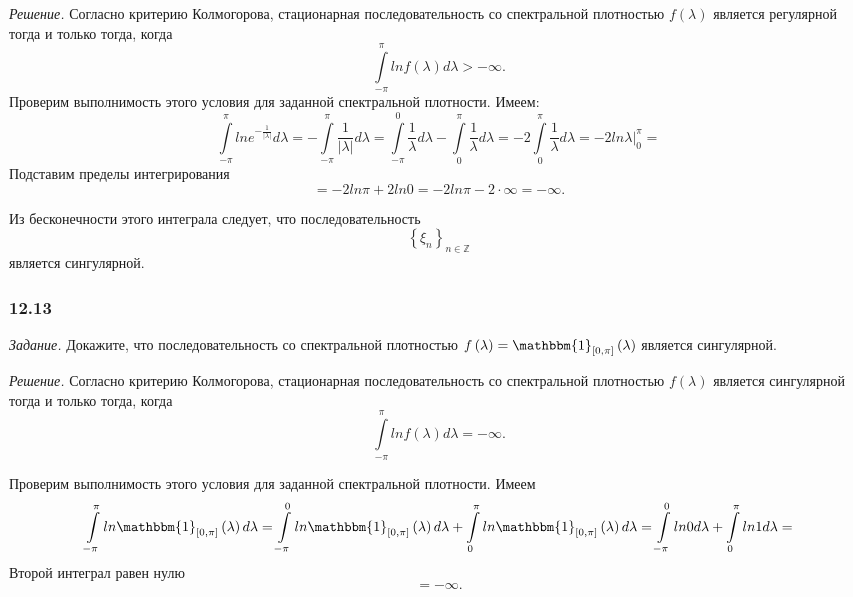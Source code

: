 \textit{Решение.}
Согласно критерию Колмогорова,
стационарная последовательность со спектральной плотностью $f \left( \lambda \right) $
является регулярной тогда и только тогда, когда
\begin{equation*}
  \int \limits_{-\pi }^{ \pi } ln f \left( \lambda \right) d \lambda >
  -\infty.
\end{equation*}
Проверим выполнимость этого условия для заданной спектральной плотности.
Имеем:
\begin{equation*}
  \int \limits_{-\pi }^{ \pi } ln e^{-\frac{1}{ \left| \lambda \right| }} d \lambda =
  -\int \limits_{-\pi }^{ \pi } \frac{1}{ \left| \lambda \right| } d \lambda =
  \int \limits_{-\pi }^0 \frac{1}{ \lambda } d \lambda -
  \int \limits_0^{ \pi } \frac{1}{ \lambda } d \lambda =
  -2 \int \limits_0^{ \pi } \frac{1}{ \lambda } d \lambda =
  -2 \left. ln \lambda \right|_0^{ \pi } =
\end{equation*}
Подставим пределы интегрирования
\begin{equation*}
  = -2 ln \pi + 2 ln 0 =
  -2 ln \pi - 2 \cdot \infty =
  -\infty.
\end{equation*}

Из бесконечности этого интеграла следует,
что последовательность
\begin{equation*}
  \left\{ \xi_n \right\}_{n \in \mathbb{Z}}
\end{equation*}
является сингулярной.

\subsubsection*{12.13}

\textit{Задание.}
Докажите, что последовательность со спектральной плотностью
$f \left( \lambda \right) =
  \mathbbm{1}_{ \left[ 0, \pi \right] } \left( \lambda \right) $
является сингулярной.

\textit{Решение.}
Согласно критерию Колмогорова,
стационарная последовательность со спектральной плотностью $f \left( \lambda \right) $
является сингулярной тогда и только тогда, когда
\begin{equation*}
  \int \limits_{-\pi }^{ \pi } ln f \left( \lambda \right) d \lambda =
  -\infty.
\end{equation*}

Проверим выполнимость этого условия для заданной спектральной плотности.
Имеем
\begin{equation*}
  \int \limits_{-\pi }^{ \pi }
    ln \mathbbm{1}_{ \left[ 0, \pi \right] } \left( \lambda \right) d \lambda =
  \int \limits_{-\pi }^0 ln \mathbbm{1}_{ \left[ 0, \pi \right] } \left( \lambda \right) d \lambda +
  \int \limits_0^{ \pi } ln \mathbbm{1}_{ \left[ 0, \pi \right] } \left( \lambda \right) d \lambda =
  \int \limits_{-\pi }^0 ln 0 d \lambda + \int \limits_0^{ \pi } ln 1 d \lambda =
\end{equation*}
Второй интеграл равен нулю
\begin{equation*}
  = -\infty.
\end{equation*}

